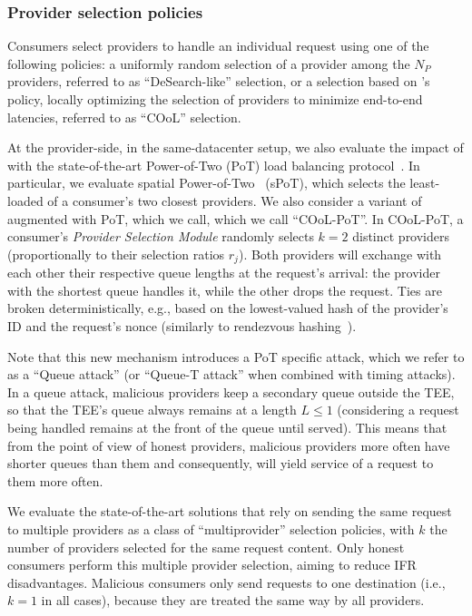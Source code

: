 \subsubsection{Provider selection policies}
Consumers select providers to handle an individual request using one of the following policies: 
a uniformly random selection of a provider among the $N_{P}$ providers, referred to as ``DeSearch-like'' selection, 
or a selection based on \sysname's policy, locally optimizing the selection of providers to minimize end-to-end latencies, referred to as ``COoL'' selection.

At the provider-side, in the same-datacenter setup, we also evaluate the impact of \sysname with the state-of-the-art Power-of-Two (PoT) load balancing protocol~\cite{mitzenmacherPowerTwoChoices2001}. 
In particular, we evaluate spatial Power-of-Two~\cite{panigrahyAnalysisEvaluationProximitybased2022} (sPoT), which selects the least-loaded of a consumer's two closest providers.
We also consider a variant of \sysname augmented with PoT, which we call, which we call ``COoL-PoT''.
In COoL-PoT, a consumer's \emph{Provider Selection Module} randomly selects $k=2$ distinct providers (proportionally to their selection ratios $r_{j}$).
Both providers will exchange with each other their respective queue lengths at the request's arrival: the provider with the shortest queue handles it, while the other drops the request. 
Ties are broken deterministically, e.g., based on the lowest-valued hash of the provider's ID and the request's nonce (similarly to rendezvous hashing~\cite{663936}).

Note that this new mechanism introduces a PoT specific attack, which we refer to as a ``Queue attack'' (or ``Queue-T attack'' when combined with timing attacks).
In a queue attack, malicious providers keep a secondary queue outside the TEE, so that the TEE's queue always remains at a length $L\leq1$ (considering a request being handled remains at the front of the queue until served).
This means that from the point of view of honest providers, malicious providers more often have shorter queues than them and consequently, will yield service of a request to them more often.

We evaluate the state-of-the-art solutions that rely on sending the same request to multiple providers as a class of ``multiprovider'' selection policies, with $k$ the number of providers selected for the same request content.
Only honest consumers perform this multiple provider selection, aiming to reduce IFR disadvantages.
Malicious consumers only send requests to one destination (i.e., $k=1$ in all cases), because they are treated the same way by all providers.